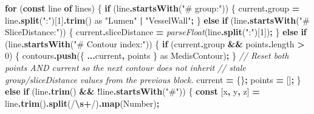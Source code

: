 \documentclass[
  11pt,
]{article}
\newenvironment{Shaded}{\begin{snugshade}}{\end{snugshade}}
\newcommand{\AttributeTok}[1]{\textcolor[rgb]{0.13,0.29,0.53}{#1}}
\newcommand{\BuiltInTok}[1]{#1}
\newcommand{\CommentTok}[1]{\textcolor[rgb]{0.56,0.35,0.01}{\textit{#1}}}
\newcommand{\ControlFlowTok}[1]{\textcolor[rgb]{0.13,0.29,0.53}{\textbf{#1}}}
\newcommand{\DecValTok}[1]{\textcolor[rgb]{0.00,0.00,0.81}{#1}}
\newcommand{\FunctionTok}[1]{\textcolor[rgb]{0.13,0.29,0.53}{\textbf{#1}}}
\newcommand{\ImportTok}[1]{#1}
\newcommand{\KeywordTok}[1]{\textcolor[rgb]{0.13,0.29,0.53}{\textbf{#1}}}
\newcommand{\NormalTok}[1]{#1}
\newcommand{\OperatorTok}[1]{\textcolor[rgb]{0.81,0.36,0.00}{\textbf{#1}}}
\newcommand{\PreprocessorTok}[1]{\textcolor[rgb]{0.56,0.35,0.01}{\textit{#1}}}
\newcommand{\SpecialCharTok}[1]{\textcolor[rgb]{0.81,0.36,0.00}{\textbf{#1}}}
\newcommand{\SpecialStringTok}[1]{\textcolor[rgb]{0.31,0.60,0.02}{#1}}
\newcommand{\StringTok}[1]{\textcolor[rgb]{0.31,0.60,0.02}{#1}}
\begin{document}
\begin{Shaded}
\begin{Highlighting}[]
  \ControlFlowTok{for}\NormalTok{ (}\KeywordTok{const}\NormalTok{ line }\KeywordTok{of}\NormalTok{ lines) \{}
    \ControlFlowTok{if}\NormalTok{ (line}\OperatorTok{.}\FunctionTok{startsWith}\NormalTok{(}\StringTok{"\# group:"}\NormalTok{)) \{}
\NormalTok{      current}\OperatorTok{.}\AttributeTok{group} \OperatorTok{=}\NormalTok{ line}\OperatorTok{.}\FunctionTok{split}\NormalTok{(}\StringTok{":"}\NormalTok{)[}\DecValTok{1}\NormalTok{]}\OperatorTok{.}\FunctionTok{trim}\NormalTok{() }\ImportTok{as} \StringTok{"Lumen"} \OperatorTok{|} \StringTok{"VesselWall"}\OperatorTok{;}
\NormalTok{    \} }\ControlFlowTok{else} \ControlFlowTok{if}\NormalTok{ (line}\OperatorTok{.}\FunctionTok{startsWith}\NormalTok{(}\StringTok{"\# SliceDistance:"}\NormalTok{)) \{}
\NormalTok{      current}\OperatorTok{.}\AttributeTok{sliceDistance} \OperatorTok{=} \PreprocessorTok{parseFloat}\NormalTok{(line}\OperatorTok{.}\FunctionTok{split}\NormalTok{(}\StringTok{":"}\NormalTok{)[}\DecValTok{1}\NormalTok{])}\OperatorTok{;}
\NormalTok{    \} }\ControlFlowTok{else} \ControlFlowTok{if}\NormalTok{ (line}\OperatorTok{.}\FunctionTok{startsWith}\NormalTok{(}\StringTok{"\# Contour index:"}\NormalTok{)) \{}
      \ControlFlowTok{if}\NormalTok{ (current}\OperatorTok{.}\AttributeTok{group} \OperatorTok{\&\&}\NormalTok{ points}\OperatorTok{.}\AttributeTok{length} \OperatorTok{\textgreater{}} \DecValTok{0}\NormalTok{) \{}
\NormalTok{        contours}\OperatorTok{.}\FunctionTok{push}\NormalTok{(\{ }\OperatorTok{...}\NormalTok{current}\OperatorTok{,}\NormalTok{ points \} }\ImportTok{as}\NormalTok{ MedisContour)}\OperatorTok{;}
\NormalTok{      \}}
      \CommentTok{// Reset both points AND current so the next contour does not inherit}
      \CommentTok{// stale group/sliceDistance values from the previous block.}
\NormalTok{      current }\OperatorTok{=}\NormalTok{ \{\}}\OperatorTok{;}
\NormalTok{      points }\OperatorTok{=}\NormalTok{ []}\OperatorTok{;}
\NormalTok{    \} }\ControlFlowTok{else} \ControlFlowTok{if}\NormalTok{ (line}\OperatorTok{.}\FunctionTok{trim}\NormalTok{() }\OperatorTok{\&\&} \OperatorTok{!}\NormalTok{line}\OperatorTok{.}\FunctionTok{startsWith}\NormalTok{(}\StringTok{"\#"}\NormalTok{)) \{}
      \KeywordTok{const}\NormalTok{ [x}\OperatorTok{,}\NormalTok{ y}\OperatorTok{,}\NormalTok{ z] }\OperatorTok{=}\NormalTok{ line}\OperatorTok{.}\FunctionTok{trim}\NormalTok{()}\OperatorTok{.}\FunctionTok{split}\NormalTok{(}\SpecialStringTok{/}\SpecialCharTok{\textbackslash{}s+}\SpecialStringTok{/}\NormalTok{)}\OperatorTok{.}\FunctionTok{map}\NormalTok{(}\BuiltInTok{Number}\NormalTok{)}\OperatorTok{;}

\end{Highlighting}
\end{Shaded}
\end{document}
